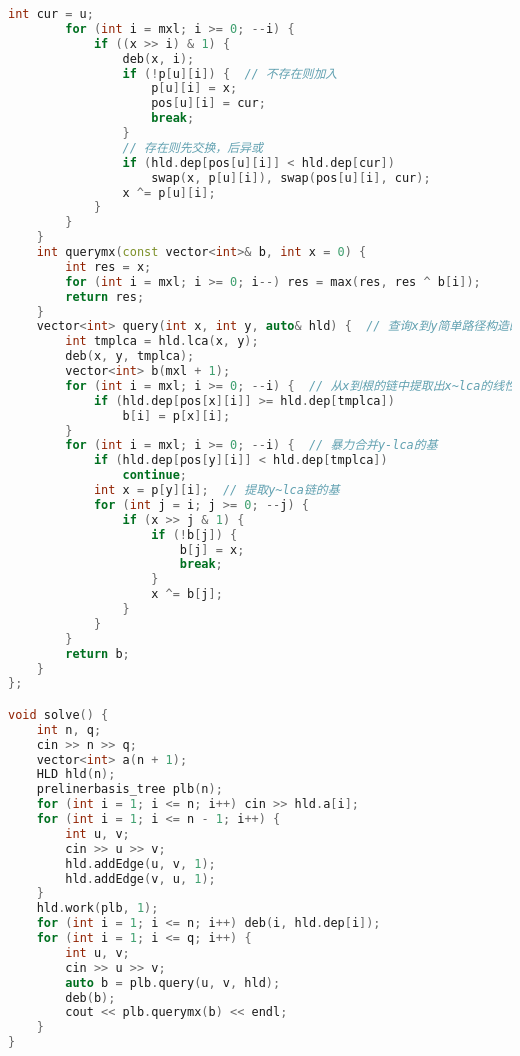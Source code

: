 \begin{lstlisting}[language=C++]
        int cur = u;
        for (int i = mxl; i >= 0; --i) {
            if ((x >> i) & 1) {
                deb(x, i);
                if (!p[u][i]) {  // 不存在则加入
                    p[u][i] = x;
                    pos[u][i] = cur;
                    break;
                }
                // 存在则先交换，后异或
                if (hld.dep[pos[u][i]] < hld.dep[cur])
                    swap(x, p[u][i]), swap(pos[u][i], cur);
                x ^= p[u][i];
            }
        }
    }
    int querymx(const vector<int>& b, int x = 0) {
        int res = x;
        for (int i = mxl; i >= 0; i--) res = max(res, res ^ b[i]);
        return res;
    }
    vector<int> query(int x, int y, auto& hld) {  // 查询x到y简单路径构造的线性基
        int tmplca = hld.lca(x, y);
        deb(x, y, tmplca);
        vector<int> b(mxl + 1);
        for (int i = mxl; i >= 0; --i) {  // 从x到根的链中提取出x~lca的线性基
            if (hld.dep[pos[x][i]] >= hld.dep[tmplca])
                b[i] = p[x][i];
        }
        for (int i = mxl; i >= 0; --i) {  // 暴力合并y-lca的基
            if (hld.dep[pos[y][i]] < hld.dep[tmplca])
                continue;
            int x = p[y][i];  // 提取y~lca链的基
            for (int j = i; j >= 0; --j) {
                if (x >> j & 1) {
                    if (!b[j]) {
                        b[j] = x;
                        break;
                    }
                    x ^= b[j];
                }
            }
        }
        return b;
    }
};

void solve() {
    int n, q;
    cin >> n >> q;
    vector<int> a(n + 1);
    HLD hld(n);
    prelinerbasis_tree plb(n);
    for (int i = 1; i <= n; i++) cin >> hld.a[i];
    for (int i = 1; i <= n - 1; i++) {
        int u, v;
        cin >> u >> v;
        hld.addEdge(u, v, 1);
        hld.addEdge(v, u, 1);
    }
    hld.work(plb, 1);
    for (int i = 1; i <= n; i++) deb(i, hld.dep[i]);
    for (int i = 1; i <= q; i++) {
        int u, v;
        cin >> u >> v;
        auto b = plb.query(u, v, hld);
        deb(b);
        cout << plb.querymx(b) << endl;
    }
}
\end{lstlisting}
